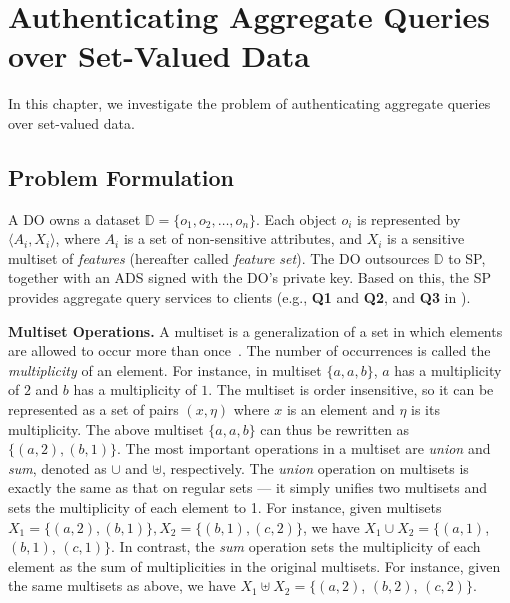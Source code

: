 \chapter{Authenticating Aggregate Queries over Set-Valued Data}\label{chap:aggregate-queries}

In this chapter, we investigate the problem of authenticating aggregate queries over set-valued data.

\section{Problem Formulation}\label{chap:aggregate-queries:problem}

A DO owns a dataset $\mathbb{D} = \{o_1, o_2, \dots, o_n\}$. Each object $o_i$ is represented by $\langle A_i, X_i \rangle$, where $A_i$ is a set of non-sensitive attributes, and $X_i$ is a sensitive multiset of \emph{features} (hereafter called \emph{feature set}). The DO outsources $\mathbb{D}$ to SP, together with an ADS signed with the DO's private key. Based on this, the SP provides aggregate query services to clients (e.g., \textbf{Q1} and \textbf{Q2}, and \textbf{Q3} in ).

\textbf{Multiset Operations.} A multiset is a generalization of a set in which elements are allowed to occur more than once~\cite{TAOCP}. The number of occurrences is called the \emph{multiplicity} of an element. For instance, in multiset $\{a, a, b\}$, $a$ has a multiplicity of $2$ and $b$ has a multiplicity of $1$. The multiset is order insensitive, so it can be represented as a set of pairs $(x, \eta)$ where $x$ is an element and $\eta$ is its multiplicity. The above multiset $\{a,a,b\}$ can thus be rewritten as $\{(a,2), (b,1)\}$.
The most important operations in a multiset are \emph{union} and \emph{sum}, denoted as $\cup$ and $\uplus$, respectively. The \emph{union} operation on multisets is exactly the same as that on regular sets --- it simply unifies two multisets and sets the multiplicity of each element to 1. For instance, given multisets $X_1 = \{(a, 2), (b,1)\}, X_2 = \{(b,1), (c, 2)\} $, we have $X_1 \cup X_2 = \{(a,1)$, $(b,1)$, $(c,1)\}$. In contrast, the \emph{sum} operation sets the multiplicity of each element as the sum of multiplicities in the original multisets. For instance, given the same multisets as above, we have $X_1 \uplus X_2 = \{(a, 2)$, $(b, 2)$, $(c, 2)\}$.

